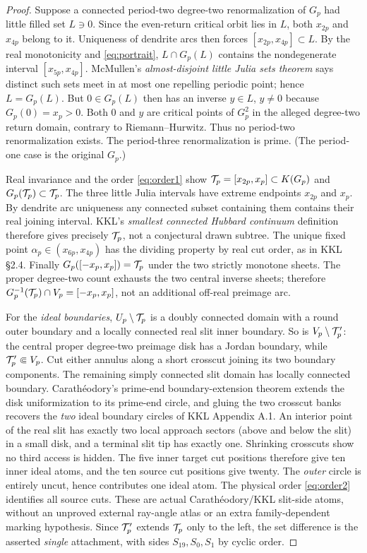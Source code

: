 \begin{proof}
Suppose a connected period-two degree-two
renormalization of $G_p$ had little filled set
$L\ni0$.  Since the even-return critical orbit
lies in $L$, both $x_{2p}$ and $x_{4p}$
belong to it.  Uniqueness of dendrite arcs
then forces $[x_{2p},x_{4p}]\subset L$.
By the real monotonicity and \eqref{eq:portrait},
$L\cap G_p(L)$ contains the nondegenerate
interval $[x_{5p},x_{4p}]$.
McMullen's \emph{almost-disjoint little Julia
sets theorem} \cite[Theorem 7.3]{McMullen1994}
says distinct such sets meet in at most
one repelling periodic point; hence $L=G_p(L)$.
But $0\in G_p(L)$ then has an inverse
$y\in L$, $y\ne0$ because $G_p(0)=x_p>0$.
Both $0$ and $y$ are critical points
of $G_p^2$ in the alleged degree-two
return domain, contrary to Riemann--Hurwitz.
Thus no period-two renormalization exists.
The period-three renormalization is prime.
(The period-one case is the original $G_p$.)

Real invariance and the order \eqref{eq:order1}
show $\mathcal T_p=[x_{2p},x_p]\subset K(G_p)$ and
$G_p(\mathcal T_p)\subset\mathcal T_p$.  The three little
Julia intervals have extreme endpoints
$x_{2p}$ and $x_p$.  By dendrite arc
uniqueness any connected subset containing
them contains their real joining interval.
KKL's \emph{smallest connected Hubbard
continuum} definition
\cite[\S2.5]{KKL2026} therefore gives
precisely $\mathcal T_p$, not a conjectural drawn
subtree.  The unique fixed point
$\alpha_p\in(x_{6p},x_{4p})$ has the
dividing property by real cut order, as
in KKL \S2.4.  Finally
$G_p([-x_p,x_p])=\mathcal T_p$
under the two strictly monotone sheets.
The proper degree-two count exhausts
the two central inverse sheets; therefore
$G_p^{-1}(\mathcal T_p)\cap V_p=[-x_p,x_p]$,
not an additional off-real preimage arc.

For the \emph{ideal boundaries}, $U_p\setminus\mathcal T_p$
is a doubly connected domain with a round
outer boundary and a locally connected real
slit inner boundary.  So is
$V_p\setminus\mathcal T_p'$: the central proper
degree-two preimage disk has a Jordan
boundary, while $\mathcal T'_p\Subset V_p$.
Cut either annulus along a short crosscut
joining its two boundary components.
The remaining simply connected slit
domain has locally connected boundary.
Carath\'eodory's prime-end
boundary-extension theorem \cite{Caratheodory1913}
extends the disk uniformization to its
prime-end circle, and gluing the two
crosscut banks recovers the \emph{two}
ideal boundary circles of KKL Appendix A.1.
An interior point of the real slit has
exactly two local approach sectors
(above and below the slit) in a small
disk, and a terminal slit tip has
exactly one.  Shrinking crosscuts
show no third access is hidden.
The five inner target cut positions
therefore give ten inner ideal atoms,
and the ten source cut positions give
twenty.  The \emph{outer} circle
is entirely uncut, hence contributes
one ideal atom.  The physical order
\eqref{eq:order2} identifies all source
cuts.  These are actual
Carath\'eodory/KKL slit-side atoms,
without an unproved external ray-angle
atlas or an extra family-dependent
marking hypothesis.  Since $\mathcal T'_p$
extends $\mathcal T_p$ only to the left,
the set difference is the asserted
\emph{single} attachment, with
sides $S_{19},S_0,S_1$ by cyclic order.
\end{proof}

